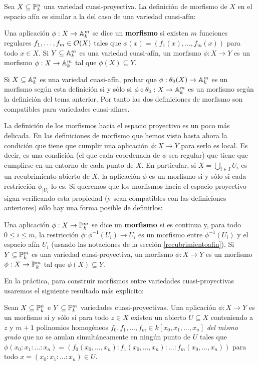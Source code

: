 \documentclass[ACGA.tex]{subfiles}
\begin{document}
Sea $X\subseteq\mathbb{P}^n_k$ una variedad cuasi-proyectiva. La definición de morfismo de $X$ en el espacio afín es similar a la del caso de una variedad cuasi-afín:

\begin{defi}
 Una aplicación $\phi:X\to \mathbb{A}^m_k$ se dice un {\bf morfismo} si existen $m$ funciones regulares $f_1,\ldots,f_m\in{\mathcal O}(X)$ tales que $\phi(x)=(f_1(x),\ldots,f_m(x))$ para todo $x\in X$. Si $Y\subseteq\mathbb{A}^m_k$ es una variedad cuasi-afín, un morfismo $\phi:X\to Y$ es un morfismo $\phi:X\to\mathbb{A}^m_k$ tal que $\phi(X)\subseteq Y$.
\end{defi}

\begin{ejer}
 Si $X\subseteq\mathbb{A}^n_k$ es una variedad cuasi-afín, probar que $\phi:\theta_0(X)\to\mathbb{A}^m_k$ es un morfismo según esta definición si y sólo si $\phi\circ\theta_0:X\to\mathbb{A}^m_k$ es un morfismo según la definición del tema anterior. Por tanto las dos definiciones de morfismo son compatibles para variedades cuasi-afines.
\end{ejer}

La definición de los morfismos hacia el espacio proyectivo es un poco más delicada. En las definiciones de morfismo que hemos visto hasta ahora la condición que tiene que cumplir una aplicación $\phi:X\to Y$ para serlo es local. Es decir, es una condición (el que cada coordenada de $\phi$ sea regular) que tiene que cumplirse en un entorno de cada punto de $X$. En particular, si $X=\bigcup_{i\in I} U_i$ es un recubrimiento abierto de $X$, la aplicación $\phi$ es un morfismo si y sólo si cada restricción $\phi_{|U_i}$ lo es. Si queremos que los morfismos hacia el espacio proyectivo sigan verificando esta propiedad (y sean compatibles con las definiciones anteriores) sólo hay una forma posible de definirlos:

\begin{defi}
 Una aplicación $\phi:X\to\mathbb{P}^m_k$ se dice un ${\bf morfismo}$ si es continua y, para todo $0\leq i\leq m$, la restricción $\phi:\phi^{-1}(U_i)\to U_i$ es un morfismo entre $\phi^{-1}(U_i)$ y el espacio afín $U_i$ (usando las notaciones de la sección \ref{recubrimientoafin}). Si $Y\subseteq\mathbb{P}^m_k$ es una variedad cuasi-proyectiva, un morfismo $\phi:X\to Y$ es un morfismo $\phi:X\to\mathbb{P}^m_k$ tal que $\phi(X)\subseteq Y$.
\end{defi}
 
En la práctica, para construir morfismos entre variedades cuasi-proyectivas usaremos el siguiente resultado más explícito:

\begin{prop}
 Sean $X\subseteq\mathbb{P}^n_k$ e $Y\subseteq\mathbb{P}^m_k$ variedades cuasi-proyectivas. Una aplicación $\phi:X\to Y$ es un morfismo si y sólo si para todo $z\in X$ existen un abierto $U\subseteq X$ conteniendo a $z$ y $m+1$ polinomios homogéneos $f_0,f_1,\ldots,f_m\in k[x_0,x_1,\ldots,x_n]$ \emph{del mismo grado} que no se anulan simultáneamente en ningún punto de $U$ tales que $\phi(x_0:x_1:\ldots:x_n)=(f_0(x_0,\ldots,x_n):f_1(x_0,\ldots,x_n):\ldots:f_m(x_0,\ldots,x_n))$ para todo $x=(x_0:x_1:\ldots:x_n)\in U$.
\end{prop}
\end{document}

